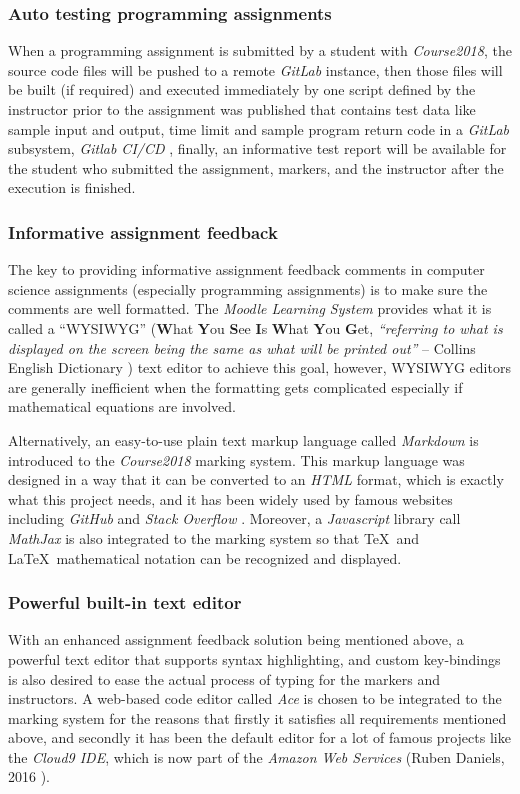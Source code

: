 \subsubsection{Auto testing programming assignments}
When a programming assignment is submitted by a student with \emph{Course2018},
the source code files will be pushed to a remote \emph{GitLab} instance, then
those files will be built (if required) and executed immediately by one script
defined by
the instructor prior to the assignment was published that contains test data
like sample input and output, time limit and sample program return code
in a \emph{GitLab} subsystem, \emph{Gitlab CI/CD} \cite{gitlabci},
finally, an informative test report
will be available for the student who submitted the assignment, markers, and
the instructor after the execution is finished.

\subsubsection{Informative assignment feedback}
The key to providing informative assignment feedback comments in computer
science assignments (especially programming assignments) is to make sure the
comments are well formatted.
The \emph{Moodle Learning System} provides what it is called a
{\hyphenchar{} ``WYSIWYG''}
(\textbf{W}hat \textbf{Y}ou \textbf{S}ee \textbf{I}s \textbf{W}hat
\textbf{Y}ou \textbf{G}et, 
\emph{``referring to what is displayed on the screen being the same as what
will be printed out''} -- Collins English Dictionary \cite{wysiwyg})
text editor to achieve this goal, however, WYSIWYG editors are generally
inefficient when the formatting gets complicated especially if mathematical
equations are involved.

Alternatively, an easy-to-use plain text markup language called \emph{Markdown}
is introduced to the \emph{Course2018} marking system. This markup language was
designed in a way that it can be converted to an \emph{HTML} format, which is
exactly what this project needs, and it has been
widely used by famous websites including \emph{GitHub} \cite{gitHubMarkdown}
and \emph{Stack Overflow} \cite{stackOverflowMarkdown}.
Moreover, a \emph{Javascript} library call \emph{MathJax} is also integrated
to the marking system so that \TeX\ and \LaTeX\ mathematical notation can be
recognized and displayed.

\subsubsection{Powerful built-in text editor}
With an enhanced assignment feedback solution being mentioned above, a powerful
text editor that supports syntax highlighting, and custom key-bindings is also
desired to ease the actual process of typing for the markers and instructors.
A web-based code editor called \emph{Ace} \cite{aceEditor} is chosen to be
integrated to the marking system for the reasons that firstly it satisfies all
requirements mentioned above, and secondly it has been the default editor for a
lot of famous projects like the \emph{Cloud9 IDE}, which is now part of the
\emph{Amazon Web Services} (Ruben Daniels, 2016 \cite{cloud9}).
